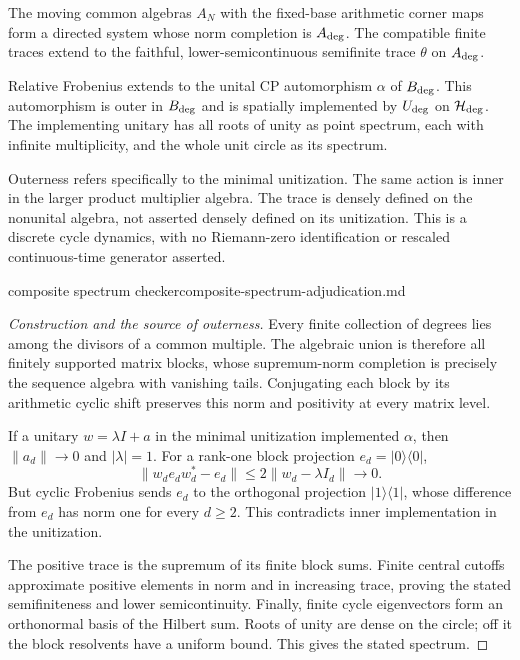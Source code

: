 \begin{theorem}
\statusSketch\quad
The moving common algebras $A_N$ with the fixed-base arithmetic corner
maps form a directed system whose norm completion is $A_{\rm deg}$.
The compatible finite traces extend to the faithful, lower-semicontinuous
semifinite trace $\theta$ on $A_{\rm deg}$.

Relative Frobenius extends to the unital CP automorphism $\alpha$ of
$B_{\rm deg}$. This automorphism is outer in $B_{\rm deg}$ and is spatially
implemented by $U_{\rm deg}$ on $\mathcal H_{\rm deg}$. The implementing
unitary has all roots of unity as point spectrum, each with infinite
multiplicity, and the whole unit circle as its spectrum.
\end{theorem}
\begin{scope}
Outerness refers specifically to the minimal unitization. The same action
is inner in the larger product multiplier algebra. The trace is densely
defined on the nonunital algebra, not asserted densely defined on its
unitization. This is a discrete cycle dynamics, with no Riemann-zero
identification or rescaled continuous-time generator asserted.
\end{scope}
{composite spectrum checker}{composite-spectrum-adjudication.md}

\begin{proof}[Construction and the source of outerness]
Every finite collection of degrees lies among the divisors of a common
multiple. The algebraic union is therefore all finitely supported matrix
blocks, whose supremum-norm completion is precisely the sequence algebra
with vanishing tails. Conjugating each block by its arithmetic cyclic
shift preserves this norm and positivity at every matrix level.

If a unitary $w=\lambda I+a$ in the minimal unitization implemented
$\alpha$, then $\|a_d\|\to0$ and $|\lambda|=1$. For a rank-one block
projection $e_d=|0\rangle\langle0|$,
\[
 \|w_d e_d w_d^*-e_d\|\leq2\|w_d-\lambda I_d\|\longrightarrow0.
\]
But cyclic Frobenius sends $e_d$ to the orthogonal projection
$|1\rangle\langle1|$, whose difference from $e_d$ has norm one for
every $d\geq2$. This contradicts inner implementation in the unitization.

The positive trace is the supremum of its finite block sums. Finite
central cutoffs approximate positive elements in norm and in increasing
trace, proving the stated semifiniteness and lower semicontinuity.
Finally, finite cycle eigenvectors form an orthonormal basis of the Hilbert
sum. Roots of unity are dense on the circle; off it the block resolvents
have a uniform bound. This gives the stated spectrum.
\end{proof}

